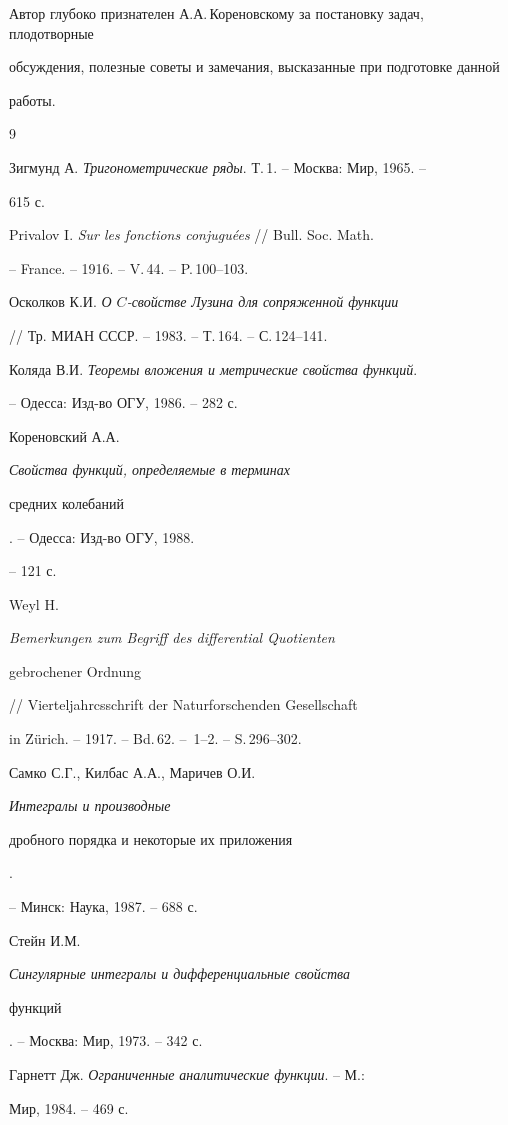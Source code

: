Автор глубоко признателен А.А.\,Кореновскому за постановку задач, плодотворные


обсуждения, полезные советы и замечания, высказанные при подготовке данной


работы.








\begin{thebibliography}{9}







Зигмунд А. {\em Тригонометрические ряды}. Т.\,1. -- Москва: Мир, 1965. --


615 с.




Privalov I. {\em Sur les fonctions conjugu\'ees} // Bull. Soc. Math.


 -- France. -- 1916. -- V.\,44. -- P.\,100--103.




Осколков К.И. {\em О $C$-свойстве Лузина для сопряженной функции}


// Тр. МИАН СССР. -- 1983. -- Т.\,164. -- С.\,124--141.




Коляда В.И. {\em Теоремы вложения и метрические свойства функций}.


-- Одесса: Изд-во ОГУ, 1986. -- 282 с.




Кореновский А.А. {\em Свойства функций, определяемые в терминах


средних колебаний}. -- Одесса: Изд-во ОГУ, 1988.


-- 121 с.




Weyl H. {\em Bemerkungen zum Begriff des differential Quotienten


gebrochener Ordnung}


// Vierteljahrcsschrift der Naturforschenden Gesellschaft


in Z\"urich. -- 1917. -- Bd.\,62. -- \No\,1--2. -- S.\,296--302.




Самко С.Г., Килбас А.А., Маричев О.И. {\em Интегралы и производные


дробного порядка и некоторые их приложения}.


-- Минск: Наука, 1987. -- 688 с.




Стейн И.М. {\em Сингулярные интегралы и дифференциальные свойства


функций}. -- Москва: Мир, 1973. -- 342 с.




Гарнетт Дж. {\em Ограниченные аналитические функции}. -- М.:


Мир, 1984. -- 469 с.





\end{thebibliography}
